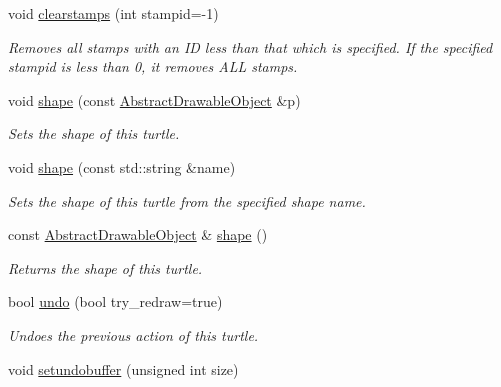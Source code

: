 \begin{DoxyCompactItemize}
\mbox{\label{classcturtle_1_1Turtle_a92d143232f35dd3ff64af3236182442d}} 
void \hyperlink{classcturtle_1_1Turtle_a92d143232f35dd3ff64af3236182442d}{clearstamps} (int stampid=-\/1)
\begin{DoxyCompactList}\small\item\em Removes all stamps with an ID less than that which is specified. If the specified stampid is less than 0, it removes A\+LL stamps. \end{DoxyCompactList}\item 
void \hyperlink{classcturtle_1_1Turtle_a5143887bbdb59bb55f583b62b2152a8e}{shape} (const \hyperlink{classcturtle_1_1AbstractDrawableObject}{Abstract\+Drawable\+Object} \&p)
\begin{DoxyCompactList}\small\item\em Sets the shape of this turtle. \end{DoxyCompactList}\item 
void \hyperlink{classcturtle_1_1Turtle_aecd7fb607369e3ece1854caa6ed92128}{shape} (const std\+::string \&name)
\begin{DoxyCompactList}\small\item\em Sets the shape of this turtle from the specified shape name. \end{DoxyCompactList}\item 
\mbox{\label{classcturtle_1_1Turtle_ab5b05852723852c00681da0844124e44}} 
const \hyperlink{classcturtle_1_1AbstractDrawableObject}{Abstract\+Drawable\+Object} \& \hyperlink{classcturtle_1_1Turtle_ab5b05852723852c00681da0844124e44}{shape} ()
\begin{DoxyCompactList}\small\item\em Returns the shape of this turtle. \end{DoxyCompactList}\item 
\mbox{\label{classcturtle_1_1Turtle_a123ef5c4bb86046e43a7bb138de81566}} 
bool \hyperlink{classcturtle_1_1Turtle_a123ef5c4bb86046e43a7bb138de81566}{undo} (bool try\+\_\+redraw=true)
\begin{DoxyCompactList}\small\item\em Undoes the previous action of this turtle. \end{DoxyCompactList}\item 
void \hyperlink{classcturtle_1_1Turtle_a91536102f8903dc237d97dbf3f326eba}{setundobuffer} (unsigned int size)

\end{DoxyCompactItemize}
